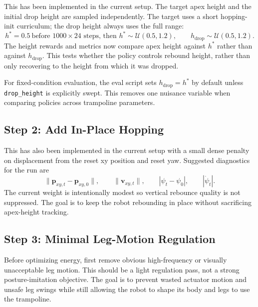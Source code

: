 \documentclass[11pt, a4paper]{article}
\begin{document}
This has been implemented in the current setup. The target apex height and
the initial drop height are sampled independently. The target uses a short
hopping-init curriculum; the drop height always uses the full range:
\[
    h^{*}=0.5\ \text{before }1000\times24\text{ steps, then }
    h^{*}\sim \mathcal{U}(0.5,1.2), \qquad
    h_{\mathrm{drop}} \sim \mathcal{U}(0.5, 1.2).
\]
The height rewards and metrics now compare apex height against $h^{*}$ rather
than against $h_{\mathrm{drop}}$. This tests whether the policy controls
rebound height, rather than only recovering to the height from which it was
dropped.

For fixed-condition evaluation, the eval script sets
$h_{\mathrm{drop}}=h^{*}$ by default unless \texttt{drop\_height} is explicitly
swept. This removes one nuisance variable when comparing policies across
trampoline parameters.

\subsection{Step 2: Add In-Place Hopping}

This has also been implemented in the current setup with a small dense penalty
on displacement from the reset xy position and reset yaw. Suggested diagnostics
for the run are
\[
    \lVert \bm{p}_{xy,t}-\bm{p}_{xy,0}\rVert,\qquad
    \lVert \bm{v}_{xy,t}\rVert,\qquad
    |\psi_t-\psi_0|,\qquad
    |\dot{\psi}_t|.
\]
The current weight is intentionally modest so vertical rebounce quality is not
suppressed. The goal is to keep the robot rebounding in place without
sacrificing apex-height tracking.

\subsection{Step 3: Minimal Leg-Motion Regulation}

Before optimizing energy, first remove obvious high-frequency or visually
unacceptable leg motion. This should be a light regulation pass, not a strong
posture-imitation objective. The goal is to prevent wasted actuator motion and
unsafe leg swings while still allowing the robot to shape its body and legs to
use the trampoline.
\end{document}
